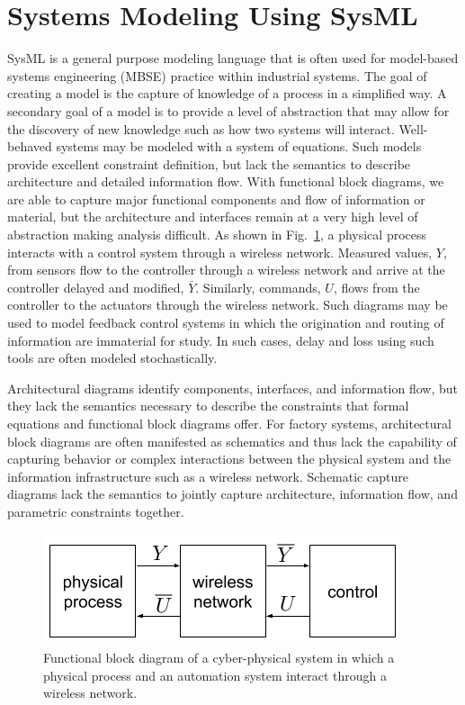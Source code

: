 \documentclass[journal, twoside]{IEEEtran}
\begin{document}
	\section{Systems Modeling Using SysML}\label{sec:systemsmodeling}
	SysML is a general purpose modeling language that is often used for model-based systems engineering (MBSE) practice within industrial systems. The goal of creating a model is the capture of knowledge of a process in a simplified way.  A secondary goal of a model is to provide a level of abstraction that may allow for the discovery of new knowledge such as how two systems will interact.  Well-behaved systems may be modeled with a system of equations.  Such models provide excellent constraint definition, but lack the semantics to describe architecture and detailed information flow.  With functional block diagrams, we are able to capture major functional components and flow of information or material, but the architecture and interfaces remain at a very high level of abstraction making analysis difficult. As shown in Fig.~\ref{fig:fbd-system}, a physical process interacts with a control system through a wireless network.  Measured values, $Y$, from sensors flow to the controller through a wireless network and arrive at the controller delayed and modified, $\bar{Y}$.  Similarly, commands, $U$, flows from the controller to the actuators through the wireless network.  Such diagrams may be used to model feedback control systems in which the origination and routing of information are immaterial for study. In such cases, delay and loss using such tools are often modeled stochastically.
    
    Architectural diagrams identify components, interfaces, and information flow, but they lack the semantics necessary to describe the constraints that formal equations and functional block diagrams offer.  For factory systems, architectural block diagrams are often manifested as schematics and thus lack the capability of capturing behavior or complex interactions between the physical system and the information infrastructure such as a wireless network.  Schematic capture diagrams lack the semantics to jointly capture architecture, information flow, and parametric constraints together. 
    
    \begin{figure}
    	\centering
        \includegraphics[width=\columnwidth]{diagrams/fbd-system}
        \caption{Functional block diagram of a cyber-physical system in which a physical process and an automation system interact through a wireless network.}
        \label{fig:fbd-system}
    \end{figure}
    
\end{document}
